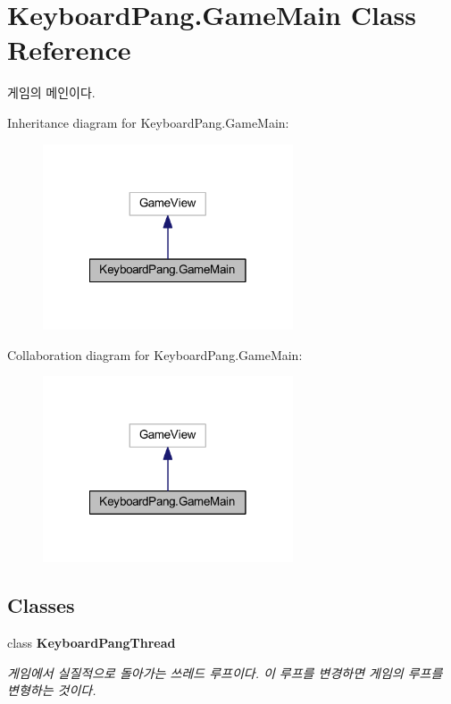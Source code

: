 \hypertarget{class_keyboard_pang_1_1_game_main}{\section{Keyboard\-Pang.\-Game\-Main Class Reference}
\label{class_keyboard_pang_1_1_game_main}
}


게임의 메인이다.  




Inheritance diagram for Keyboard\-Pang.\-Game\-Main\-:
\nopagebreak
\begin{figure}[H]
\begin{center}
\leavevmode
\includegraphics[width=210pt]{class_keyboard_pang_1_1_game_main__inherit__graph}
\end{center}
\end{figure}


Collaboration diagram for Keyboard\-Pang.\-Game\-Main\-:
\nopagebreak
\begin{figure}[H]
\begin{center}
\leavevmode
\includegraphics[width=210pt]{class_keyboard_pang_1_1_game_main__coll__graph}
\end{center}
\end{figure}
\subsection*{Classes}
\begin{DoxyCompactItemize}
\item 
class {\bfseries Keyboard\-Pang\-Thread}
\begin{DoxyCompactList}\small\item\em 게임에서 실질적으로 돌아가는 쓰레드 루프이다. 이 루프를 변경하면 게임의 루프를 변형하는 것이다. \end{DoxyCompactList}\end{DoxyCompactItemize}
